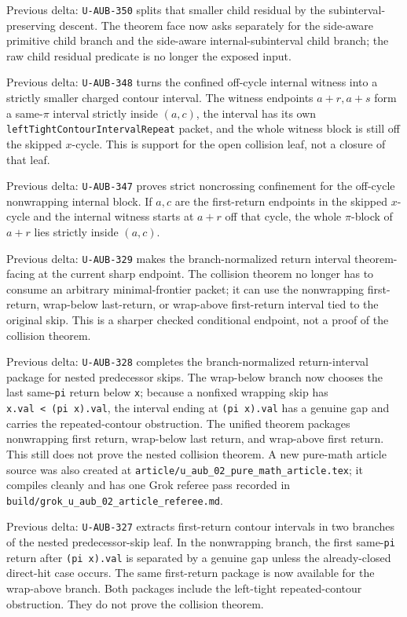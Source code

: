\documentclass[
]{article}
\begin{document}
Previous delta: \texttt{U-AUB-350} splits that smaller child residual by
the subinterval-preserving descent. The theorem face now asks separately
for the side-aware primitive child branch and the side-aware
internal-subinterval child branch; the raw child residual predicate is
no longer the exposed input.

Previous delta: \texttt{U-AUB-348} turns the confined off-cycle internal
witness into a strictly smaller charged contour interval. The witness
endpoints \(a+r,a+s\) form a same-\(\pi\) interval strictly inside
\((a,c)\), the interval has its own
\texttt{leftTightContourIntervalRepeat} packet, and the whole witness
block is still off the skipped \(x\)-cycle. This is support for the open
collision leaf, not a closure of that leaf.

Previous delta: \texttt{U-AUB-347} proves strict noncrossing confinement
for the off-cycle nonwrapping internal block. If \(a,c\) are the
first-return endpoints in the skipped \(x\)-cycle and the internal
witness starts at \(a+r\) off that cycle, the whole \(\pi\)-block of
\(a+r\) lies strictly inside \((a,c)\).

Previous delta: \texttt{U-AUB-329} makes the branch-normalized return
interval theorem-facing at the current sharp endpoint. The collision
theorem no longer has to consume an arbitrary minimal-frontier packet;
it can use the nonwrapping first-return, wrap-below last-return, or
wrap-above first-return interval tied to the original skip. This is a
sharper checked conditional endpoint, not a proof of the collision
theorem.

Previous delta: \texttt{U-AUB-328} completes the branch-normalized
return-interval package for nested predecessor skips. The wrap-below
branch now chooses the last same-\texttt{pi} return below \texttt{x};
because a nonfixed wrapping skip has
\texttt{x.val\ \textless{}\ (pi\ x).val}, the interval ending at
\texttt{(pi\ x).val} has a genuine gap and carries the repeated-contour
obstruction. The unified theorem packages nonwrapping first return,
wrap-below last return, and wrap-above first return. This still does not
prove the nested collision theorem. A new pure-math article source was
also created at \texttt{article/u\_aub\_02\_pure\_math\_article.tex}; it
compiles cleanly and has one Grok referee pass recorded in
\texttt{build/grok\_u\_aub\_02\_article\_referee.md}.

Previous delta: \texttt{U-AUB-327} extracts first-return contour
intervals in two branches of the nested predecessor-skip leaf. In the
nonwrapping branch, the first same-\texttt{pi} return after
\texttt{(pi\ x).val} is separated by a genuine gap unless the
already-closed direct-hit case occurs. The same first-return package is
now available for the wrap-above branch. Both packages include the
left-tight repeated-contour obstruction. They do not prove the collision
theorem.
\end{document}
